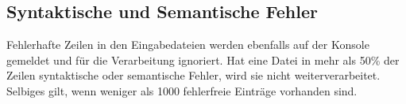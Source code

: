 \subsection{Syntaktische und Semantische Fehler}\label{subsec:syntaktische-semant-fehler-behandlung}
Fehlerhafte Zeilen in den Eingabedateien werden ebenfalls auf der Konsole gemeldet und für die Verarbeitung ignoriert.
Hat eine Datei in mehr als 50\% der Zeilen syntaktische oder semantische Fehler, wird sie nicht weiterverarbeitet.
Selbiges gilt, wenn weniger als 1000 fehlerfreie Einträge vorhanden sind.



